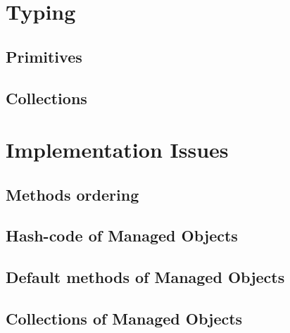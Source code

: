 \section{Typing}\label{sec:Implementation Typing}

\subsection{Primitives}\label{subsec:Typing Primitives}

\subsection{Collections}\label{subsec:Typing Collections}

\section{Implementation Issues}\label{sec:Implementation Issues}

\subsection{Methods ordering}\label{subsec:Methods ordering}

\subsection{Hash-code of Managed Objects}\label{subsec:Hashcode of Managed Objects}

\subsection{Default methods of Managed Objects}\label{subsec:Default methods of Managed Objects}

\subsection{Collections of Managed Objects}\label{subsec:Collections of Managed Objects}

